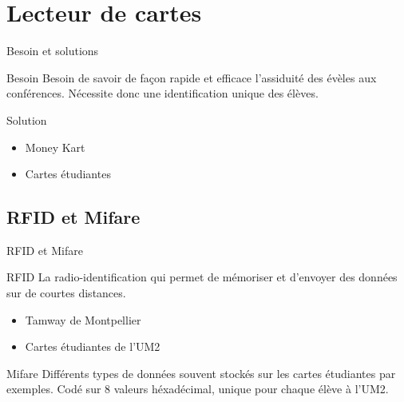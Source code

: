 \section{Lecteur de cartes}
\begin{frame}{Besoin et solutions}
	\begin{block}{Besoin}
        Besoin de savoir de façon rapide et efficace l'assiduité des évèles aux 
        conférences. Nécessite donc une identification unique des élèves.
	\end{block}

	\begin{block}{Solution}
	    \begin{itemize}
            \item Money Kart
            \item Cartes étudiantes
	    \end{itemize}
	\end{block}
\end{frame}


\subsection{RFID et Mifare}
\begin{frame}{RFID et Mifare}
	\begin{block}{RFID}
        La radio-identification qui permet de mémoriser et d'envoyer des données sur
        de courtes distances.

	    \begin{itemize}
            \item Tamway de Montpellier
            \item Cartes étudiantes de l'UM2
	    \end{itemize}
	\end{block}

	\begin{block}{Mifare}
        Différents types de données souvent stockés sur les cartes étudiantes par
        exemples. Codé sur 8 valeurs héxadécimal, unique pour chaque élève à l'UM2.
	\end{block}
\end{frame}


